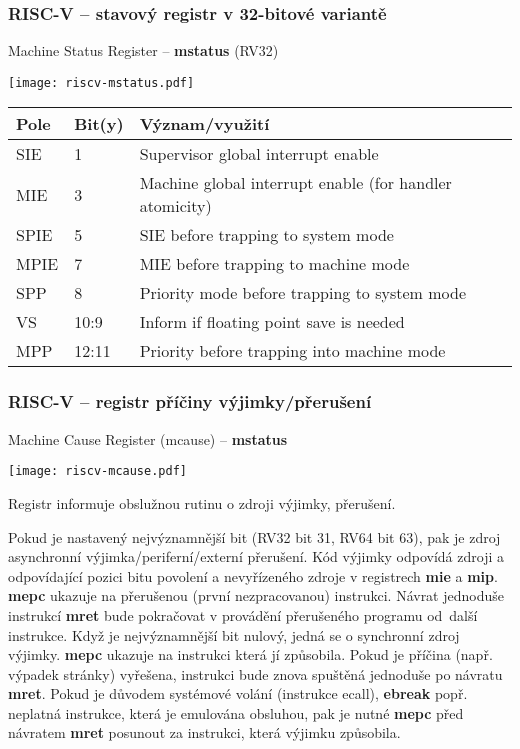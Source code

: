 \documentclass{beamer}
\begin{document}
\begin{frame}
\frametitle{RISC-V -- stavový registr v 32-bitové variantě}

Machine Status Register -- \textbf{mstatus} (RV32)

\begin{center}
  \texttt{[image: riscv-mstatus.pdf]}
\end{center}

\begin{tabular}{|l|l|l|}  \hline
Pole & Bit(y) & Význam/využití \\\hline
SIE & 1 & Supervisor global interrupt enable \\\hline
MIE & 3 & Machine global interrupt enable (for handler atomicity) \\\hline
SPIE & 5 & SIE before trapping to system mode \\\hline
MPIE & 7 & MIE before trapping to machine mode \\\hline
SPP & 8 & Priority mode before trapping to system mode \\\hline
VS & 10:9 & Inform if floating point save is needed \\\hline
MPP & 12:11 & Priority before trapping into machine mode \\\hline
\end{tabular}
\end{frame}

\begin{frame}
\frametitle{RISC-V -- registr příčiny výjimky/přerušení}

Machine Cause Register (mcause) -- \textbf{mstatus}

\begin{center}
  \texttt{[image: riscv-mcause.pdf]}
\end{center}

\small
Registr informuje obslužnou rutinu o zdroji výjimky, přerušení.

Pokud je nastavený nejvýznamnější bit (RV32 bit 31, RV64 bit 63), pak je zdroj
asynchronní výjimka/periferní/externí přerušení. Kód výjimky odpovídá
zdroji a odpovídající pozici bitu povolení a nevyřízeného zdroje v registrech
\textbf{mie} a \textbf{mip}. \textbf{mepc} ukazuje na přerušenou (první nezpracovanou)
instrukci. Návrat jednoduše instrukcí \textbf{mret} bude pokračovat v provádění přerušeného
programu od~další instrukce. Když je nejvýznamnější bit nulový, jedná se o synchronní zdroj výjimky.
\textbf{mepc} ukazuje na instrukci která jí způsobila. Pokud je příčina
(např. výpadek stránky) vyřešena, instrukci bude znova spuštěná jednoduše
po návratu \textbf{mret}. Pokud je důvodem systémové volání (instrukce ecall), \textbf{ebreak} popř.
neplatná instrukce, která je emulována obsluhou, pak je nutné \textbf{mepc} před návratem \textbf{mret}
posunout za instrukci, která výjimku způsobila.


\end{frame}
\end{document}
